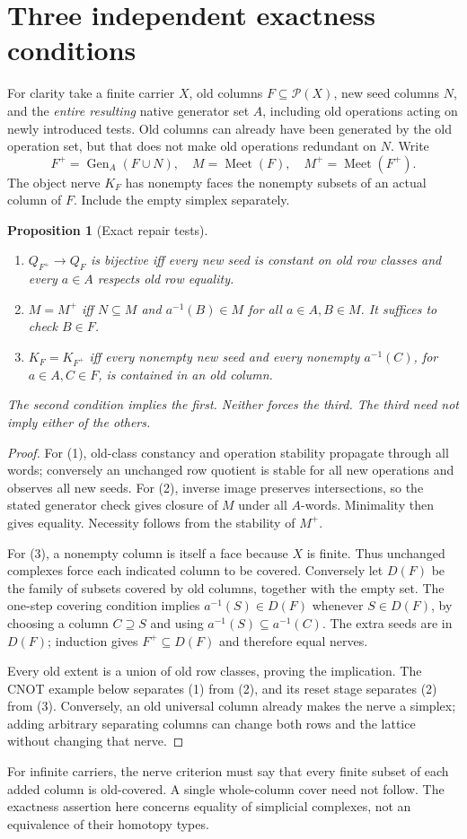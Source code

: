 \documentclass[11pt]{article}
\newtheorem{proposition}[theorem]{Proposition}
\theoremstyle{remark}\newtheorem{remark}[theorem]{Remark}
\newcommand{\Pow}{\mathcal P}
\newcommand{\Gen}{\operatorname{Gen}}
\newcommand{\Meet}{\operatorname{Meet}}
\begin{document}
\section{Three independent exactness conditions}
For clarity take a finite carrier $X$, old columns $F\subseteq\Pow(X)$,
new seed columns $N$, and the \emph{entire resulting} native generator
set $A$, including old operations acting on newly introduced tests.
Old columns can already have been generated by the old operation set,
but that does not make old operations redundant on $N$. Write
\[
 F^+=\Gen_A(F\cup N),\quad M=\Meet(F),\quad M^+=\Meet(F^+).
\]
The object nerve $K_F$ has nonempty faces the nonempty subsets of an
actual column of $F$. Include the empty simplex separately.

\begin{proposition}[Exact repair tests]
\begin{enumerate}
\item $Q_{F^+}\to Q_F$ is bijective iff every new seed is constant on
old row classes and every $a\in A$ respects old row equality.
\item $M=M^+$ iff $N\subseteq M$ and
$a^{-1}(B)\in M$ for all $a\in A,B\in M$. It suffices to check
$B\in F$.
\item $K_F=K_{F^+}$ iff every nonempty new seed and every nonempty
$a^{-1}(C)$, for $a\in A,C\in F$, is contained in an old column.
\end{enumerate}
The second condition implies the first. Neither forces the third.
The third need not imply either of the others.
\end{proposition}
\begin{proof}
For (1), old-class constancy and operation stability propagate through
all words; conversely an unchanged row quotient is stable for all
new operations and observes all new seeds. For (2), inverse image
preserves intersections, so the stated generator check gives closure
of $M$ under all $A$-words. Minimality then gives equality. Necessity
follows from the stability of $M^+$.

For (3), a nonempty column is itself a face because $X$ is finite.
Thus unchanged complexes force each indicated column to be covered.
Conversely let $D(F)$ be the family of subsets covered by old columns,
together with the empty set. The one-step covering condition implies
$a^{-1}(S)\in D(F)$ whenever $S\in D(F)$, by choosing a column
$C\supseteq S$ and using
$a^{-1}(S)\subseteq a^{-1}(C)$. The extra seeds are in $D(F)$;
induction gives $F^+\subseteq D(F)$ and therefore equal nerves.

Every old extent is a union of old row classes, proving the implication.
The CNOT example below separates (1) from (2), and its reset stage
separates (2) from (3). Conversely, an old universal column already
makes the nerve a simplex; adding arbitrary separating columns can
change both rows and the lattice without changing that nerve.
\end{proof}
For infinite carriers, the nerve criterion must say that every finite
subset of each added column is old-covered. A single whole-column
cover need not follow. The exactness assertion here concerns equality
of simplicial complexes, not an equivalence of their homotopy types.
\end{document}
